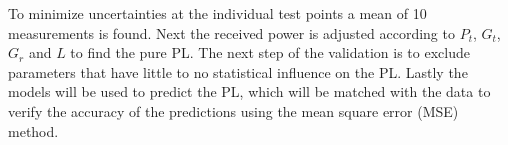 To minimize uncertainties at the individual test points a mean of 10 measurements is found. Next the received power is adjusted according to $P_t$, $G_t$, $G_r$ and $L$ to find the pure PL. The next step of the validation is to exclude parameters that have little to no statistical influence on the PL. Lastly the models will be used to predict the PL, which will be matched with the data to verify the accuracy of the predictions using the mean square error (MSE) method.  